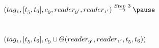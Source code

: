 \begin{frame}
\begin{columns}[c]
{  $\mathnormal{(tag_1, [t_5,t_6], c_9, reader_{9'}, reader_{1'})} \overset{Step~3}{\rightarrow} \pause$ \\~\\~\\

  $\mathnormal{(tag_1, [t_5,t_6], c_9 \cup \Theta(reader_{9'}, reader_{1'}, t_5, t_6))}$
}

\end{columns}

\end{frame}
